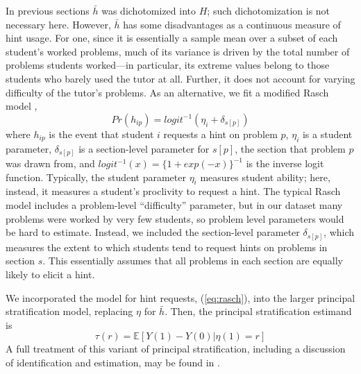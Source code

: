 \documentclass{article}\usepackage[]{graphicx}\usepackage[]{color}
\newcommand{\EE}{\mathbb{E}}
\begin{document}
In previous sections $\bar{h}$ was dichotomized into $H$; such
dichotomization is not necessary here.
However, $\bar{h}$ has some disadvantages as a continuous measure of
hint usage.
For one, since it is essentially a sample mean over a subset of each student's
worked problems, much of its variance is driven by the total number of
problems students worked---in particular, its extreme values belong to
those students who barely used the tutor at all.
Further, it does not account for varying difficulty of the tutor's
problems.
As an alternative, we fit a
modified Rasch model \citep[e.g.][]{rasch},
\begin{equation}\label{eq:rasch}
Pr(h_{ip})=logit^{-1}(\eta_i+\delta_{s[p]})
\end{equation}
where $h_{ip}$ is the event that student $i$ requests a hint on
problem $p$, $\eta_i$ is a student parameter, $\delta_{s[p]}$ is a
section-level parameter for $s[p]$, the section that problem $p$ was
drawn from, and $logit^{-1}(x)=\{1+exp(-x)\}^{-1}$ is the inverse logit
function.
Typically, the student parameter $\eta_i$ measures student ability;
here, instead, it measures a student's proclivity to request a hint.
The typical Rasch model includes a problem-level ``difficulty'' parameter, but in our
dataset many problems were worked by very few students, so problem
level parameters would be hard to estimate.
Instead, we included the section-level parameter $\delta_{s[p]}$,
which measures the extent to which students tend to request hints on
problems in section $s$.
This essentially assumes that all problems in each section are equally
likely to elicit a hint.

We incorporated the model for hint requests, (\ref{eq:rasch}), into
the larger principal stratification model, replacing $\eta$ for
$\bar{h}$.
Then, the principal stratification estimand is
\begin{equation*}
\tau(r)=\EE[Y(1)-Y(0)|\eta(1)=r]
\end{equation*}
A full treatment of this variant of principal stratification, including a
discussion of identification and estimation, may be found in
\citet{aoas}.
\end{document}
